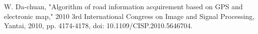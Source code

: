 \documentclass[10pt, conference, compsocconf]{IEEEtran}
\begin{document}
	
	
	
	
	
	\begin{thebibliography}{1}
		
		W. Da-chuan, "Algorithm of road information acquirement based on GPS and electronic map," 2010 3rd International Congress on Image and Signal Processing, Yantai, 2010, pp. 4174-4178, doi: 10.1109/CISP.2010.5646704.



		
	\end{thebibliography}
\end{document}
